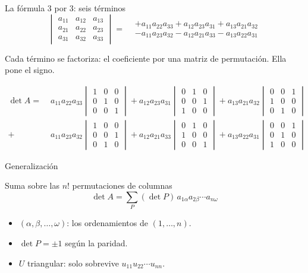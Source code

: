 \documentclass[aspectratio=169,11pt]{beamer}
\newcommand{\dt}[1]{\det #1}
\newcommand{\dbar}[1]{%
  \begin{vmatrix} #1 \end{vmatrix}%
}
\begin{document}
\begin{frame}{La fórmula 3 por 3: seis términos}
  \[
    \dbar{a_{11} & a_{12} & a_{13} \\
          a_{21} & a_{22} & a_{23} \\
          a_{31} & a_{32} & a_{33}}
    =
    \begin{aligned}
      &+ a_{11}a_{22}a_{33} + a_{12}a_{23}a_{31}
         + a_{13}a_{21}a_{32} \\
      &- a_{11}a_{23}a_{32} - a_{12}a_{21}a_{33}
         - a_{13}a_{22}a_{31}
    \end{aligned}
  \]

  Cada término se factoriza: el coeficiente por una \alert{matriz de
  permutación}. Ella pone el signo.

  \footnotesize
  \[
    \begin{aligned}
      \dt{A} =\;
        & a_{11}a_{22}a_{33}\dbar{1 & 0 & 0 \\ 0 & 1 & 0 \\ 0 & 0 & 1}
        + a_{12}a_{23}a_{31}\dbar{0 & 1 & 0 \\ 0 & 0 & 1 \\ 1 & 0 & 0}
        + a_{13}a_{21}a_{32}\dbar{0 & 0 & 1 \\ 1 & 0 & 0 \\ 0 & 1 & 0}
        \\[0.4em]
        + & a_{11}a_{23}a_{32}\dbar{1 & 0 & 0 \\ 0 & 0 & 1 \\ 0 & 1 & 0}
        + a_{12}a_{21}a_{33}\dbar{0 & 1 & 0 \\ 1 & 0 & 0 \\ 0 & 0 & 1}
        + a_{13}a_{22}a_{31}\dbar{0 & 0 & 1 \\ 0 & 1 & 0 \\ 1 & 0 & 0}
    \end{aligned}
  \]
  \normalsize



\end{frame}

\begin{frame}{Generalización}
  \begin{block}{Suma sobre las $n!$ permutaciones de columnas}
    \[
      \dt{A} = \sum_{P} (\dt{P})\, a_{1\alpha}a_{2\beta}\cdots
               a_{n\omega}
    \]
  \end{block}

  \begin{itemize}
    \item $(\alpha,\beta,\ldots,\omega)$: los ordenamientos de
          $(1,\ldots,n)$.
    \item $\dt{P} = \pm 1$ según la paridad.
    \item $U$ triangular: solo sobrevive
          $u_{11}u_{22}\cdots u_{nn}$.
  \end{itemize}
\end{frame}
\end{document}
